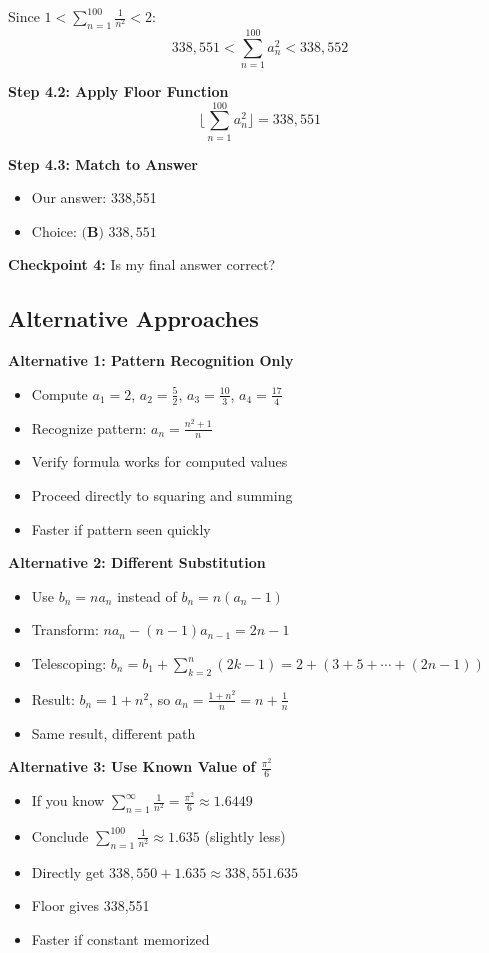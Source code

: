 \documentclass[12pt]{article}
\begin{document}
\begin{solutionbox}
Since $1 < \sum_{n=1}^{100} \frac{1}{n^2} < 2$:
\[338{,}551 < \sum_{n=1}^{100} a_n^2 < 338{,}552\]

\textbf{Step 4.2: Apply Floor Function}
\[\lfloor \sum_{n=1}^{100} a_n^2 \rfloor = 338{,}551\]

\textbf{Step 4.3: Match to Answer}
\begin{itemize}
    \item Our answer: 338,551
    \item Choice: $\textbf{(B) } 338{,}551$
\end{itemize}

\textbf{Checkpoint 4:} Is my final answer correct?

\subsection*{Alternative Approaches}

\textbf{Alternative 1: Pattern Recognition Only}
\begin{itemize}
    \item Compute $a_1 = 2$, $a_2 = \frac{5}{2}$, $a_3 = \frac{10}{3}$, $a_4 = \frac{17}{4}$
    \item Recognize pattern: $a_n = \frac{n^2+1}{n}$
    \item Verify formula works for computed values
    \item Proceed directly to squaring and summing
    \item Faster if pattern seen quickly
\end{itemize}

\textbf{Alternative 2: Different Substitution}
\begin{itemize}
    \item Use $b_n = na_n$ instead of $b_n = n(a_n-1)$
    \item Transform: $na_n - (n-1)a_{n-1} = 2n - 1$
    \item Telescoping: $b_n = b_1 + \sum_{k=2}^{n}(2k-1) = 2 + (3+5+\cdots+(2n-1))$
    \item Result: $b_n = 1 + n^2$, so $a_n = \frac{1+n^2}{n} = n + \frac{1}{n}$
    \item Same result, different path
\end{itemize}

\textbf{Alternative 3: Use Known Value of $\frac{\pi^2}{6}$}
\begin{itemize}
    \item If you know $\sum_{n=1}^{\infty} \frac{1}{n^2} = \frac{\pi^2}{6} \approx 1.6449$
    \item Conclude $\sum_{n=1}^{100} \frac{1}{n^2} \approx 1.635$ (slightly less)
    \item Directly get $338{,}550 + 1.635 \approx 338{,}551.635$
    \item Floor gives 338,551
    \item Faster if constant memorized
\end{itemize}


\end{solutionbox}
\end{document}
